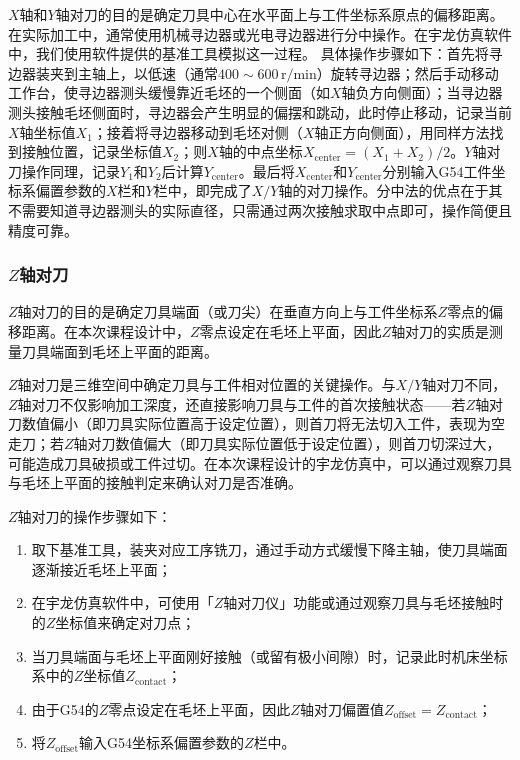 \documentclass{xautCADreport}
\begin{document}
$X$轴和$Y$轴对刀的目的是确定刀具中心在水平面上与工件坐标系原点的偏移距离。在实际加工中，通常使用机械寻边器或光电寻边器进行分中操作。在宇龙仿真软件中，我们使用软件提供的基准工具模拟这一过程。
具体操作步骤如下：首先将寻边器装夹到主轴上，以低速（通常$400\sim600\,\mathrm{r/min}$）旋转寻边器；然后手动移动工作台，使寻边器测头缓慢靠近毛坯的一个侧面（如$X$轴负方向侧面）；当寻边器测头接触毛坯侧面时，寻边器会产生明显的偏摆和跳动，此时停止移动，记录当前$X$轴坐标值$X_1$；接着将寻边器移动到毛坯对侧（$X$轴正方向侧面），用同样方法找到接触位置，记录坐标值$X_2$；则$X$轴的中点坐标$X_{\mathrm{center}} = (X_1 + X_2)/2$。$Y$轴对刀操作同理，记录$Y_1$和$Y_2$后计算$Y_{\mathrm{center}}$。最后将$X_{\mathrm{center}}$和$Y_{\mathrm{center}}$分别输入G54工件坐标系偏置参数的$X$栏和$Y$栏中，即完成了$X/Y$轴的对刀操作。分中法的优点在于其不需要知道寻边器测头的实际直径，只需通过两次接触求取中点即可，操作简便且精度可靠。


\subsubsection{$Z$轴对刀}

$Z$轴对刀的目的是确定刀具端面（或刀尖）在垂直方向上与工件坐标系$Z$零点的偏移距离。在本次课程设计中，$Z$零点设定在毛坯上平面，因此$Z$轴对刀的实质是测量刀具端面到毛坯上平面的距离。

$Z$轴对刀是三维空间中确定刀具与工件相对位置的关键操作。与$X/Y$轴对刀不同，$Z$轴对刀不仅影响加工深度，还直接影响刀具与工件的首次接触状态——若$Z$轴对刀数值偏小（即刀具实际位置高于设定位置），则首刀将无法切入工件，表现为空走刀；若$Z$轴对刀数值偏大（即刀具实际位置低于设定位置），则首刀切深过大，可能造成刀具破损或工件过切。在本次课程设计的宇龙仿真中，可以通过观察刀具与毛坯上平面的接触判定来确认对刀是否准确。


$Z$轴对刀的操作步骤如下：

\begin{enumerate}
  \item 取下基准工具，装夹对应工序铣刀，通过手动方式缓慢下降主轴，使刀具端面逐渐接近毛坯上平面；
  \item 在宇龙仿真软件中，可使用「$Z$轴对刀仪」功能或通过观察刀具与毛坯接触时的$Z$坐标值来确定对刀点；
  \item 当刀具端面与毛坯上平面刚好接触（或留有极小间隙）时，记录此时机床坐标系中的$Z$坐标值$Z_{\text{contact}}$；
  \item 由于G54的$Z$零点设定在毛坯上平面，因此$Z$轴对刀偏置值$Z_{\text{offset}} = Z_{\text{contact}}$；
  \item 将$Z_{\text{offset}}$输入G54坐标系偏置参数的$Z$栏中。
\end{enumerate}
\end{document}
